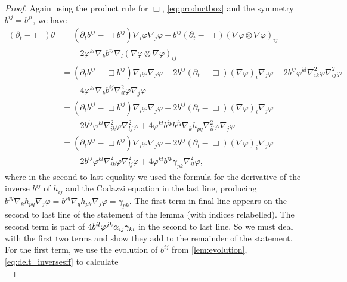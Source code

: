 \documentclass{amsart}
\begin{document}
\begin{proof}
Again using the product rule for \(\Box\), \cref{eq:productbox} and the symmetry \(b^{ij} = b^{ji}\), we have
\begin{equation}
\label{eq:delt_theta}
\begin{split}
(\partial_{t} - \Box)\theta &= (\partial_{t}b^{ij} - \Box b^{ij})\nabla_i \varphi\nabla_j\varphi + b^{ij} (\partial_{t} - \Box) (\nabla\varphi \otimes \nabla\varphi)_{ij} \\
&\quad - 2 \varphi^{kl} \nabla_k b^{ij} \nabla_l (\nabla \varphi \otimes \nabla\varphi)_{ij} \\
&= (\partial_{t}b^{ij} - \Box b^{ij})\nabla_i \varphi\nabla_j\varphi + 2 b^{ij} (\partial_{t} - \Box) (\nabla\varphi)_i \nabla_j\varphi - 2 b^{ij} \varphi^{kl} \nabla^2_{ik} \varphi \nabla^2_{lj} \varphi \\
&\quad - 4 \varphi^{kl} \nabla_k b^{ij} \nabla^2_{il} \varphi \nabla_j\varphi \\
&= (\partial_{t}b^{ij} - \Box b^{ij})\nabla_i \varphi\nabla_j\varphi + 2 b^{ij} (\partial_{t} - \Box) (\nabla\varphi)_i \nabla_j\varphi \\
&\quad - 2 b^{ij} \varphi^{kl} \nabla^2_{ik} \varphi \nabla^2_{lj} \varphi + 4 \varphi^{kl} b^{ip}b^{jq} \nabla_k h_{pq} \nabla^2_{il} \varphi \nabla_j\varphi \\
&= (\partial_{t}b^{ij} - \Box b^{ij})\nabla_i \varphi\nabla_j\varphi + 2 b^{ij} (\partial_{t} - \Box) (\nabla\varphi)_i \nabla_j\varphi \\
&\quad - 2 b^{ij} \varphi^{kl} \nabla^2_{ik} \varphi \nabla^2_{lj} \varphi + 4 \varphi^{kl} b^{ip}\gamma_{pk} \nabla^2_{il} \varphi,
\end{split}
\end{equation}
where in the second to last equality we used the formula for the derivative of the inverse \(b^{ij}\) of \(h_{ij}\) and the Codazzi equation in the last line, producing \(b^{jq} \nabla_k h_{pq} \nabla_j \varphi = b^{jq} \nabla_q h_{pk} \nabla_j \varphi = \gamma_{pk}\). The first term in final line appears on the second to last line of the statement of the lemma (with indices relabelled). The second term is part of \(4 b^{il}\varphi^{jk} \alpha_{ij} \gamma_{kl}\) in the second to last line. So we must deal with the first two terms and show they add to the remainder of the statement. For the first term, we use the evolution of \(b^{ij}\) from \cref{lem:evolution}, \cref{eq:delt_inversesff} to calculate
\begin{equation}
\label{eq:delt_theta1}

\end{equation}
\end{proof}
\end{document}

